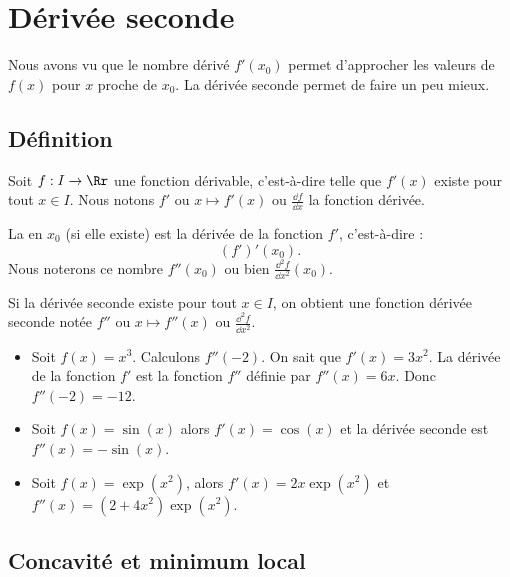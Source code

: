 \documentclass[11pt,class=report,crop=false]{standalone}
\begin{document}
\section{Dérivée seconde}


Nous avons vu que le nombre dérivé $f'(x_0)$ permet d'approcher les valeurs de $f(x)$ pour $x$ proche de $x_0$. La dérivée seconde permet de faire un peu mieux.

  
\subsection{Définition}

Soit $f : I \to \Rr$ une fonction dérivable, c'est-à-dire telle que $f'(x)$ existe pour tout $x \in I$. Nous notons $f'$ ou $x \mapsto f'(x)$ ou $\frac{\dd f}{\dd x}$ la fonction dérivée. 

\begin{definition}
La  en $x_0$ (si elle existe) est la dérivée de la fonction $f'$, c'est-à-dire :
$$(f')'(x_0).$$
Nous noterons ce nombre $f''(x_0)$ ou bien $\frac{\dd^2 f}{\dd x^2}(x_0)$.
\end{definition}

Si la dérivée seconde existe pour tout $x\in I$, on obtient une fonction dérivée seconde notée $f''$ ou $x \mapsto f''(x)$ ou $\frac{\dd^2 f}{\dd x^2}$.

\begin{exemple}
\sauteligne
\begin{itemize}
  \item Soit $f(x)= x^3$. Calculons $f''(-2)$. On sait que $f'(x) = 3x^2$.
  La dérivée de la fonction $f'$ est la fonction $f''$ définie par $f''(x) = 6x$.
  Donc $f''(-2) = -12$.
  
  \item Soit $f(x) = \sin(x)$ alors $f'(x) = \cos(x)$ et la dérivée seconde est $f''(x) = - \sin(x)$.
  
  \item Soit $f(x) = \exp(x^2)$, alors $f'(x) = 2x \exp(x^2)$ et $f''(x) = (2 + 4x^2)\exp(x^2)$. 
\end{itemize}
\end{exemple}



\subsection{Concavité et minimum local}
\end{document}
